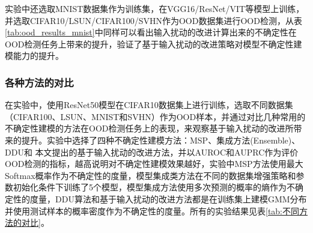 实验中还选取MNIST数据集作为训练集，在VGG16/ResNet/VIT等模型上训练，并选取CIFAR10/LSUN/CIFAR100/SVHN作为OOD数据集进行OOD检测，从表\ref{tab:ood_results_mnist}中同样可以看出输入扰动的改进计算出来的不确定性在OOD检测任务上带来的提升，验证了基于输入扰动的改进策略对模型不确定性建模能力的提升。
\begin{table}[h]
    \captionsetup{font=small, justification=centering}
    \centering
    \renewcommand{\arraystretch}{1.0} %
    \caption{在CIFAR10上训练不同的模型(VGG16,ResNet50,VIT)，选取SVHN、LSUN、CIFAR100、MNIST作为OOD样本，对比DDU和梯度范数(GradNorm)对模型不确定性的建模效果，报告指标是AUROC($\uparrow$) / AUPRC($\uparrow$)}
    \label{tab:ood_results_mnist}
\end{table}



\subsubsection{各种方法的对比}
在实验中，使用ResNet50模型在CIFAR10数据集上进行训练，选取不同数据集（CIFAR100、LSUN、MNIST和SVHN）作为OOD样本，并通过对比几种常用的不确定性建模的方法在OOD检测任务上的表现，来观察基于输入扰动的改进所带来的提升。实验中选择了四种不确定性建模方法：MSP、集成方法(Ensemble)、DDU和 本文提出的基于输入扰动的改进方法，并以AUROC和AUPRC作为评价OOD检测的指标，越高说明对不确定性建模效果越好，实验中MSP方法使用最大Softmax概率作为不确定性的度量，模型集成类方法在不同的数据集增强策略和参数初始化条件下训练了5个模型，模型集成方法使用多次预测的概率的熵作为不确定性的度量，DDU算法和基于输入扰动的改进方法都是在训练集上建模GMM分布并使用测试样本的概率密度作为不确定性的度量。所有的实验结果见表\ref{tab:不同方法的对比}。



